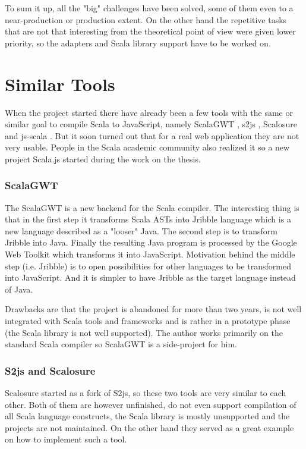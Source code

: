 \documentclass[12pt,a4paper]{report}
\begin{document}
To sum it up, all the "big" challenges have been solved, some of them even to a near-production or production extent. On the other hand the repetitive tasks that are not that interesting from the theoretical point of view were given lower priority, so the adapters and Scala library support have to be worked on.

\section{Similar Tools}

When the project started there have already been a few tools with the same or similar goal to compile Scala to JavaScript, namely ScalaGWT \cite{ScalaGwt}, s2js \cite{S2js}, Scalosure \cite{Scalosure} and js-scala  \cite{JsScala}. But it soon turned out that for a real web application they are not very usable. People in the Scala academic community also realized it so a new project Scala.js \cite{ScalaJs} started during the work on the thesis.

\subsubsection*{ScalaGWT}

The ScalaGWT is a new backend for the Scala compiler. The interesting thing is that in the first step it transforms Scala ASTs into Jribble language which is a new language described as a "looser" Java. The second step is to transform Jribble into Java. Finally the resulting Java program is processed by the Google Web Toolkit \cite{Gwt} which transforms it into JavaScript. Motivation behind the middle step (i.e. Jribble) is to open possibilities for other languages to be transformed into JavaScript. And it is simpler to have Jribble as the target language instead of Java.

Drawbacks are that the project is abandoned for more than two years, is not well integrated with Scala tools and frameworks and is rather in a prototype phase (the Scala library is not well supported). The author works primarily on the standard Scala compiler so ScalaGWT is a side-project for him.

\subsubsection*{S2js and Scalosure}

Scalosure started as a fork of S2js, so these two tools are very similar to each other. Both of them are however unfinished, do not even support compilation of all Scala language constructs, the Scala library is mostly unsupported and the projects are not maintained. On the other hand they served as a great example on how to implement such a tool.
\end{document}
